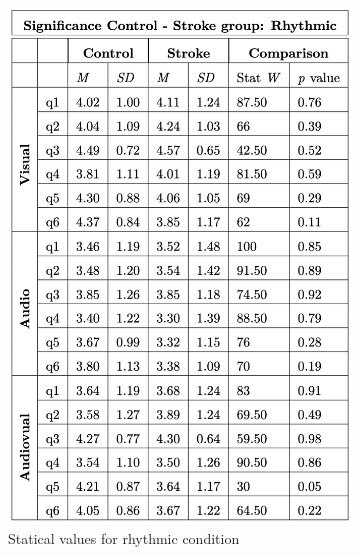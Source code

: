 \begin{figure}[htbp]
    \begin{subfigure}[htbp]{0.43\textwidth}
        \centering
        \includegraphics[width=\textwidth]{significance_tables/significance_control_pop.png}
        \caption{Statical values for rhythmic condition}
        \label{fig: significance_pop_rhythmic} 
    \end{subfigure} 
    \begin{subfigure}[htbp]{0.45\textwidth}
        \centering

\end{subfigure}
\end{figure}
